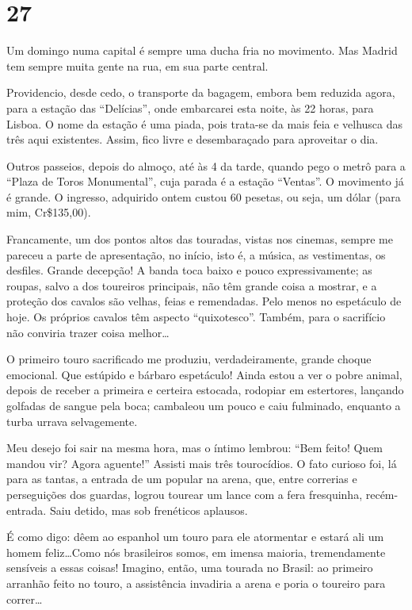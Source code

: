 \section*{27 \adfflatleafright {}}
Um domingo numa capital é sempre uma ducha fria no movimento. Mas Madrid tem sempre muita gente na rua, em sua parte central.

Providencio, desde cedo, o transporte da bagagem, embora bem reduzida agora, para a estação das ``Delícias'', onde embarcarei esta noite, às 22 horas, para Lisboa. O nome da estação é uma piada, pois trata-se da mais feia e velhusca das três aqui existentes. Assim, fico livre e desembaraçado para aproveitar o dia.

Outros passeios, depois do almoço, até às 4 da tarde, quando pego o metrô para a ``Plaza de Toros Monumental'', cuja parada é a estação ``Ventas''. O movimento já é grande. O ingresso, adquirido ontem custou 60 pesetas, ou seja, um dólar (para mim, Cr\$135,00).

Francamente, um dos pontos altos das touradas, vistas nos cinemas, sempre me pareceu a parte de apresentação, no início, isto é, a música, as vestimentas, os desfiles. Grande decepção! A banda toca baixo e pouco expressivamente; as roupas, salvo a dos toureiros principais, não têm grande coisa a mostrar, e a proteção dos cavalos são velhas, feias e remendadas. Pelo menos no espetáculo de hoje. Os próprios cavalos têm aspecto ``quixotesco''. Também, para o sacrifício não conviria trazer coisa melhor\ldots

O primeiro touro sacrificado me produziu, verdadeiramente, grande choque emocional. Que estúpido e bárbaro espetáculo! Ainda estou a ver o pobre animal, depois de receber a primeira e certeira estocada, rodopiar em estertores, lançando golfadas de sangue pela boca; cambaleou um pouco e caiu fulminado, enquanto a turba urrava selvagemente.

Meu desejo foi sair na mesma hora, mas o íntimo lembrou: ``Bem feito! Quem mandou vir? Agora aguente!'' Assisti mais três tourocídios. O fato curioso foi, lá para as tantas, a entrada de um popular na arena, que, entre correrias e perseguições dos guardas, logrou tourear um lance com a fera fresquinha, recém-entrada. Saiu detido, mas sob frenéticos aplausos.

É como digo: dêem ao espanhol um touro para ele atormentar e estará ali um homem feliz\ldots Como nós brasileiros somos, em imensa maioria, tremendamente sensíveis a essas coisas! Imagino, então, uma tourada no Brasil: ao primeiro arranhão feito no touro, a assistência invadiria a arena e poria o toureiro para correr\ldots

